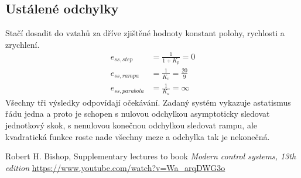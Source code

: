 \documentclass[twoside]{article}
\begin{document}
\subsection{Ustálené odchylky}
Stačí dosadit do vztahů za dříve zjištěné hodnoty konstant polohy, rychlosti a zrychlení.
\begin{equation}
	\begin{split}
		e_{ss, step} &= \frac{1}{1+K_p} = 0\\
		e_{ss, rampa} &= \frac{1}{K_v} = \frac{20}{9}\\
		e_{ss, parabola} &= \frac{1}{K_a} = \infty
	\end{split}
\end{equation}
Všechny tři výsledky odpovídají očekávání. Zadaný systém vykazuje astatismus řádu jedna a proto je schopen
s nulovou odchylkou asymptoticky sledovat jednotkový skok, s nenulovou konečnou odchylkou sledovat rampu,
ale kvadratická funkce roste nade všechny meze a odchylka tak je nekonečná.

\begin{thebibliography}{9}

	Robert H. Bishop, Supplementary lectures to book \emph{Modern control systems, 13th edition} 
		\url{https://www.youtube.com/watch?v=Wa_arqDWG3o}

\end{thebibliography}
\end{document}
